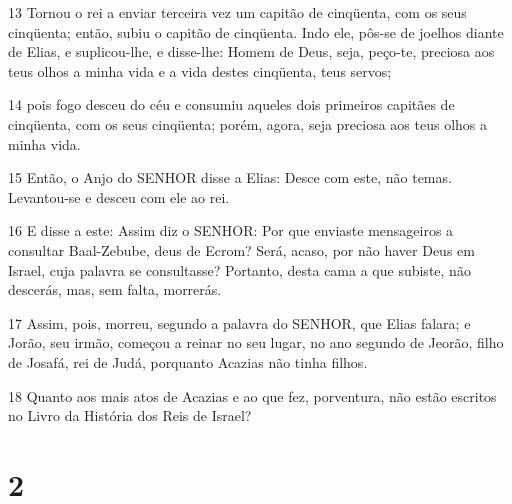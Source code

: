 \par 13 Tornou o rei a enviar terceira vez um capitão de cinqüenta, com os seus cinqüenta; então, subiu o capitão de cinqüenta. Indo ele, pôs-se de joelhos diante de Elias, e suplicou-lhe, e disse-lhe: Homem de Deus, seja, peço-te, preciosa aos teus olhos a minha vida e a vida destes cinqüenta, teus servos;
\par 14 pois fogo desceu do céu e consumiu aqueles dois primeiros capitães de cinqüenta, com os seus cinqüenta; porém, agora, seja preciosa aos teus olhos a minha vida.
\par 15 Então, o Anjo do SENHOR disse a Elias: Desce com este, não temas. Levantou-se e desceu com ele ao rei.
\par 16 E disse a este: Assim diz o SENHOR: Por que enviaste mensageiros a consultar Baal-Zebube, deus de Ecrom? Será, acaso, por não haver Deus em Israel, cuja palavra se consultasse? Portanto, desta cama a que subiste, não descerás, mas, sem falta, morrerás.
\par 17 Assim, pois, morreu, segundo a palavra do SENHOR, que Elias falara; e Jorão, seu irmão, começou a reinar no seu lugar, no ano segundo de Jeorão, filho de Josafá, rei de Judá, porquanto Acazias não tinha filhos.
\par 18 Quanto aos mais atos de Acazias e ao que fez, porventura, não estão escritos no Livro da História dos Reis de Israel?

\chapter{2}

